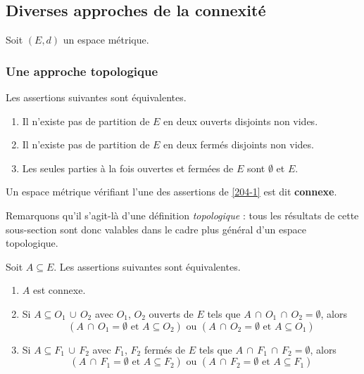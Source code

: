 




  \subsection{Diverses approches de la connexité}

  Soit $(E,d)$ un espace métrique.

  \subsubsection{Une approche topologique}


  \begin{proposition}
    \label{204-1}
    Les assertions suivantes sont équivalentes.
    \begin{enumerate}[label={\bfseries(\roman*)}]
      \item Il n'existe pas de partition de $E$ en deux ouverts disjoints non vides.
      \item Il n'existe pas de partition de $E$ en deux fermés disjoints non vides.
      \item Les seules parties à la fois ouvertes et fermées de $E$ sont $\emptyset$ et $E$.
    \end{enumerate}
  \end{proposition}

  \begin{definition}
    Un espace métrique vérifiant l'une des assertions de \cref{204-1} est dit \textbf{connexe}.
  \end{definition}

  \begin{remark}
    Remarquons qu'il s'agit-là d'une définition \textit{topologique} : tous les résultats de cette sous-section sont donc valables dans le cadre plus général d'un espace topologique.
  \end{remark}

  \begin{proposition}
    Soit $A \subseteq E$. Les assertions suivantes sont équivalentes.
    \begin{enumerate}[label={\bfseries(\roman*)}]
      \item $A$ est connexe.
      \item Si $A \subseteq O_1 \, \cup \, O_2$ avec $O_1$, $O_2$ ouverts de $E$ tels que $A \, \cap \, O_1 \, \cap \, O_2 = \emptyset$, alors
      \[ (A \, \cap \, O_1 = \emptyset \text{ et } A \subseteq O_2) \text{ ou } (A \, \cap \, O_2 = \emptyset \text{ et } A \subseteq O_1) \]
      \item Si $A \subseteq F_1 \, \cup \, F_2$ avec $F_1$, $F_2$ fermés de $E$ tels que $A \, \cap \, F_1 \, \cap \, F_2 = \emptyset$, alors
      \[ (A \, \cap \, F_1 = \emptyset \text{ et } A \subseteq F_2) \text{ ou } (A \, \cap \, F_2 = \emptyset \text{ et } A \subseteq F_1) \]
    \end{enumerate}
  \end{proposition}

